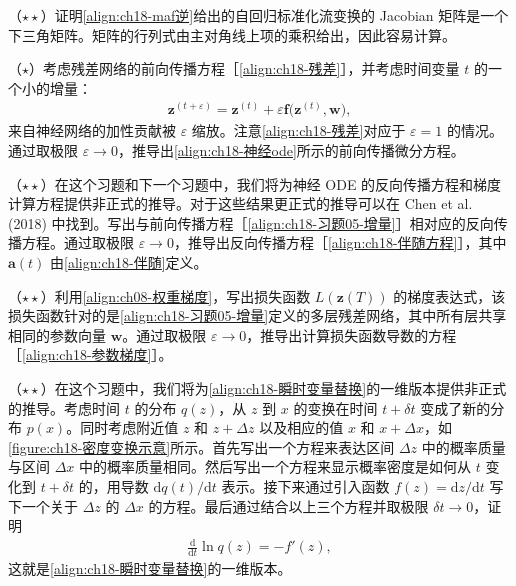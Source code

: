 \documentclass[../../main.tex]{subfiles}
\begin{document}
\begin{exercise}\label{exercise:ch18-04}
（$\star\star$）证明\eqref{align:ch18-maf逆}给出的自回归标准化流变换的 Jacobian 矩阵是一个下三角矩阵。矩阵的行列式由主对角线上项的乘积给出，因此容易计算。
\end{exercise}

\begin{exercise}\label{exercise:ch18-05}
（$\star$）考虑残差网络的前向传播方程［\eqref{align:ch18-残差}］，并考虑时间变量 $t$ 的一个小的增量：
\begin{align}
  \bm{z}^{(t+\varepsilon)}=\bm{z}^{(t)}+\varepsilon\bm{f}\big(\bm{z}^{(t)},\bm{w}\big),\label{align:ch18-习题05-增量}
\end{align}
来自神经网络的加性贡献被 $\varepsilon$ 缩放。注意\eqref{align:ch18-残差}对应于 $\varepsilon=1$ 的情况。通过取极限 $\varepsilon\to0$，推导出\eqref{align:ch18-神经ode}所示的前向传播微分方程。
\end{exercise}

\begin{exercise}\label{exercise:ch18-06}
（$\star\star$）在这个习题和下一个习题中，我们将为神经 ODE 的反向传播方程和梯度计算方程提供非正式的推导。对于这些结果更正式的推导可以在 Chen et al. (2018) 中找到。写出与前向传播方程［\eqref{align:ch18-习题05-增量}］相对应的反向传播方程。通过取极限 $\varepsilon\to0$，推导出反向传播方程［\eqref{align:ch18-伴随方程}］，其中 $\bm{a}(t)$ 由\eqref{align:ch18-伴随}定义。
\end{exercise}

\begin{exercise}\label{exercise:ch18-07}
（$\star\star$）利用\eqref{align:ch08-权重梯度}，写出损失函数 $L(\bm{z}(T))$ 的梯度表达式，该损失函数针对的是\eqref{align:ch18-习题05-增量}定义的多层残差网络，其中所有层共享相同的参数向量 $\bm{w}$。通过取极限 $\varepsilon\to0$，推导出计算损失函数导数的方程［\eqref{align:ch18-参数梯度}］。
\end{exercise}

\begin{exercise}\label{exercise:ch18-08}
（$\star\star$）在这个习题中，我们将为\eqref{align:ch18-瞬时变量替换}的一维版本提供非正式的推导。考虑时间 $t$ 的分布 $q(z)$，从 $z$ 到 $x$ 的变换在时间 $t+\delta t$ 变成了新的分布 $p(x)$。同时考虑附近值 $z$ 和 $z+\Delta z$ 以及相应的值 $x$ 和 $x+\Delta x$，如\cref{figure:ch18-密度变换示意}所示。首先写出一个方程来表达区间 $\Delta z$ 中的概率质量与区间 $\Delta x$ 中的概率质量相同。然后写出一个方程来显示概率密度是如何从 $t$ 变化到 $t+\delta t$ 的，用导数 $\mathrm{d}q(t)/\mathrm{d}t$ 表示。接下来通过引入函数 $f(z)=\mathrm{d}z/\mathrm{d}t$ 写下一个关于 $\Delta z$ 的 $\Delta x$ 的方程。最后通过结合以上三个方程并取极限 $\delta t\to0$，证明
\begin{align}
  \frac{\mathrm{d}}{\mathrm{d}t}\ln q(z)=-f'(z),\label{align:ch18-习题08-一维}
\end{align}
这就是\eqref{align:ch18-瞬时变量替换}的一维版本。
\end{exercise}
\end{document}
